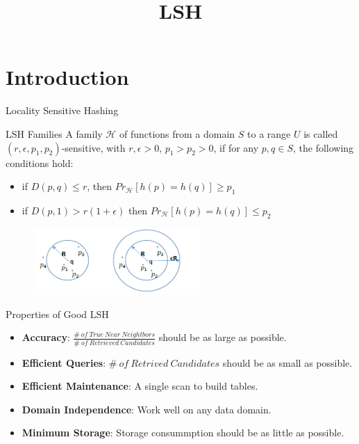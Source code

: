 \documentclass{beamer}
\title{LSH}
\begin{document}
	\maketitle
	\section{Introduction}
	\begin{frame}{Locality Sensitive Hashing}
	\begin{block}{LSH Families}
		A family $\mathcal{H}$ of functions from a domain $S$ to a range $U$ is called $(r, \epsilon, p_1, p_2)$-sensitive, with $r, \epsilon>0$, $p_1>p_2>0$, if for any $p, q\in S$, the following conditions hold:
		\begin{itemize}
			\item if $D(p, q)\leq r$, then $Pr_{\mathcal{H}}[h(p)=h(q)]\geq p_1$
			\item if $D(p, 1)>r(1+\epsilon)$ then $Pr_{\mathcal{H}}[h(p)=h(q)]\leq p_2$
		\end{itemize}
	\end{block}
	\begin{figure}
		\includegraphics[width=2.5in]{figures/intro_lsh.png}
	\end{figure}
	\end{frame}
	
	\begin{frame}{Properties of Good LSH}
	\small
		\begin{itemize}
			\item \textbf{Accuracy}: $\frac{\#\ of\ True\ Near\ Neightbors}{\#\ of\ Retrieved\ Candidates}$ should be as large as possible.
			\vspace{2ex}
			\item\textbf{Efficient Queries}: \small{$\#\ of\ Retrived\ Candidates$} should be as small as possible.
			\vspace{2ex}
			\item \textbf{Efficient Maintenance}: A single scan to build tables.
			\vspace{2ex}
			\item \textbf{Domain Independence}: Work well on any data domain.
			\vspace{2ex}
			\item \textbf{Minimum Storage}: Storage consummption should be as little as possible.
		\end{itemize}
	\end{frame}
\end{document}
